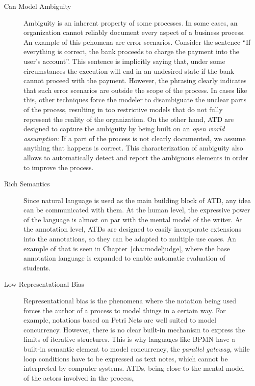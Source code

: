 \begin{description}
\item[Can Model Ambiguity] {Ambiguity is an inherent property of some processes.
    In some cases, an organization cannot reliably document every aspect of a
    business process. An example of this pehomena are error scenarios. Consider
    the sentence ``If everything is correct, the bank proceeds to charge the
    payment into the user's account''. This sentence is implicitly saying that,
    under some circumstances the execution will end in an undesired state if the
    bank cannot proceed with the payment. However, the phrasing clearly
    indicates that such error scenarios are outside the scope of the process. In
    cases like this, other techniques force the modeler to disambiguate the
    unclear parts of the process, resulting in too restrictive models that do
    not fully represent the reality of the organization. On the other hand, ATD
    are designed to capture the ambiguity by being built on an \emph{open
      world assumption}: If a part of the process is not clearly documented, we
    assume anything that happens is correct. This characterization of ambiguity
    also allows to automatically detect and report the ambiguous elements in
    order to improve the process.}
\item[Rich Semantics]{Since natural language is used as the main building block
    of ATD, any idea can be communicated with them. At the human level, the
    expressive power of the language is almost on par with the mental model of
    the writer. At the annotation level, ATDs are designed to easily incorporate
    extensions into the annotations, so they can be adapted to multiple use
    cases. An example of that is seen in Chapter~\ref{cha:modeljudge}, where the
    base annotation language is expanded to enable automatic evaluation of
    students.}
\item[Low Representational Bias]{Representational bias is the phenomena where
    the notation being used forces the author of a process to model things in a
    certain way\cite{van2011representational}. For example, notations based on
    Petri Nets are well suited to model concurrency. However, there is no clear
    built-in mechanism to express the limits of iterative structures. This is
    why languages like BPMN have a built-in semantic element to model
    concurrency, the \emph{parallel gateway}, while loop conditions have to be
    expressed as text notes, which cannot be interpreted by computer systems.
    ATDs, being close to the mental model of the actors involved in the process,
}
\end{description}
